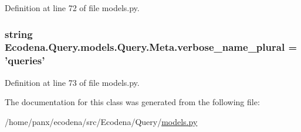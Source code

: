 Definition at line 72 of file models.py.

\hypertarget{class_ecodena_1_1_query_1_1models_1_1_query_1_1_meta_ac57db1e879cded42a3f4d35c04c56be8}{
\subsubsection[{verbose\_\-name\_\-plural}]{\setlength{\rightskip}{0pt plus 5cm}string {\bf Ecodena.Query.models.Query.Meta.verbose\_\-name\_\-plural} = 'queries'}}
\label{d2/d09/class_ecodena_1_1_query_1_1models_1_1_query_1_1_meta_ac57db1e879cded42a3f4d35c04c56be8}


Definition at line 73 of file models.py.



The documentation for this class was generated from the following file:\begin{DoxyCompactItemize}
\item 
/home/panx/ecodena/src/Ecodena/Query/\hyperlink{_query_2models_8py}{models.py}\end{DoxyCompactItemize}
